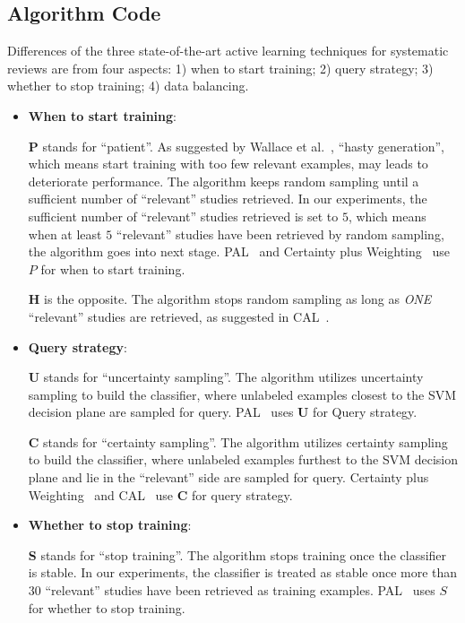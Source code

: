 \documentclass{svjour3}
\theoremstyle{break}
\begin{document}
\subsection{Algorithm Code}
\label{sect: Algorithm Code}

Differences of the three state-of-the-art active learning techniques for systematic reviews are from four aspects: 1) when to start training; 2) query strategy; 3) whether to stop training; 4) data balancing.

\begin{itemize}

\item
{\bf When to start training}: 

\textbf{P} stands for ``patient''. As suggested by Wallace et al.~\cite{wallace2010semi}, ``hasty generation'', which means start training with too few relevant examples, may leads to deteriorate performance. The algorithm keeps random sampling until a sufficient number of ``relevant'' studies retrieved. In our experiments, the sufficient number of ``relevant'' studies retrieved is set to $5$, which means when at least $5$ ``relevant'' studies have been retrieved by random sampling, the algorithm goes into next stage. PAL~\cite{wallace2010semi} and Certainty plus Weighting~\cite{miwa2014reducing} use \textbf{$P$} for when to start training.

\textbf{H} is the opposite. The algorithm stops random sampling as long as {\em ONE} ``relevant'' studies are retrieved, as suggested in CAL~\cite{cormack2014evaluation,cormack2015autonomy}.

\item
{\bf Query strategy}: 

\textbf{U} stands for ``uncertainty sampling''. The algorithm utilizes
uncertainty sampling to build the classifier, where unlabeled examples closest to the SVM decision plane are sampled for query. PAL~\cite{wallace2010semi} uses \textbf{U} for Query strategy.

\textbf{C} stands for ``certainty sampling''. The algorithm utilizes certainty sampling to build the classifier, where unlabeled examples furthest to the SVM decision plane and lie in the ``relevant'' side are sampled for query. Certainty plus Weighting~\cite{miwa2014reducing} and CAL~\cite{cormack2014evaluation,cormack2015autonomy} use \textbf{C} for query strategy.

\item
{\bf Whether to stop training}: 

\textbf{S} stands for ``stop training''. The algorithm stops training
once the classifier is stable. In our experiments, the classifier is treated as stable once more than $30$ ``relevant'' studies have been retrieved as training examples. PAL~\cite{wallace2010semi} uses \textbf{$S$} for whether to stop training.


\end{itemize}
\end{document}
